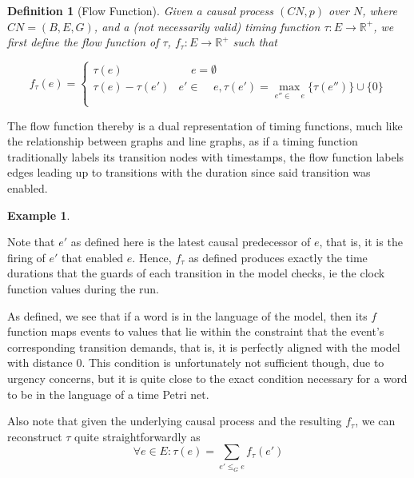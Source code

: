 \documentclass{article}
\newcounter{cases}
\DeclareMathOperator*{\pre}{^\bullet}
\theoremstyle{Definition}
\newtheorem{definition}{Definition}
\theoremstyle{definition}
\newtheorem{example}{Example}
\begin{document}
	\begin{definition}[Flow Function]
	Given a causal process $(CN, p)$ over $N$, where $CN = (B, E, G)$, and a (not necessarily valid) timing function $\tau : E \to \mathbb{R}^+$, we first define the \textit{flow} function of $\tau$, $f_{\tau} : E \to \mathbb{R}^+$ such that 
	
	$$f_{\tau}(e) = \begin{cases} 
		\tau(e) & \pre \pre e = \emptyset\\
		\tau(e) - \tau(e') &e' \in   \pre \pre e, \tau(e') = \max\limits_{e'' \in \pre \pre e} {\{\tau(e'')\}} \cup \{0\}\\
	\end{cases}
	$$
	
	\end{definition}
	
The flow function thereby is a dual representation of timing functions, much like the relationship between graphs and line graphs, as if a timing function traditionally labels its transition nodes with timestamps, the flow function labels edges leading up to transitions with the duration since said transition was enabled. 

\begin{example}\label{wordandflow}
	
\end{example}

	Note that $e'$ as defined here is the latest causal predecessor of $e$, that is, it is the firing of $e'$ that enabled $e$. 
Hence, $f_\tau$ as defined produces exactly the time durations that the guards of each transition in the model checks, ie the clock function values during the run. 

As defined, we see that if a word is in the language of the model, then its $f$ function maps events to values that lie within the constraint that the event's corresponding transition demands, that is, it is perfectly aligned with the model with distance 0. 
This condition is unfortunately not sufficient though, due to urgency concerns, but it is quite close to the exact condition necessary for a word to be in the language of a time Petri net. 

Also note that given the underlying causal process and the resulting $f_\tau$, we can reconstruct $\tau$ quite straightforwardly as $$\forall e \in E : \tau(e) = \sum_{e' \leq_G e} f_\tau(e')$$
\end{document}
